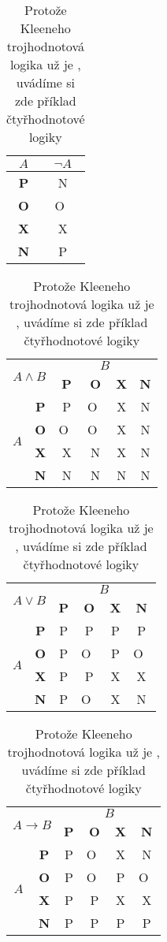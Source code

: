 \documentclass[hidelinks, 11pt, a4paper]{article}
\begin{document}
\begin{table}[h]
    \centering
    \begin{tabular}{|c|c|} \hline
        $A$ & $\neg A$ \\ \hline
        \textbf{P} & N \\ \hline
        \textbf{O} & O~\\ \hline
        \textbf{X} & X \\ \hline
        \textbf{N} & P \\ \hline
    \end{tabular}
    \begin{tabular}{|c|c|c|c|c|c|}\hline
        \multicolumn{2}{|c|}{\multirow{2}{*}{$A \land B$}}&\multicolumn{4}{c|}{$B$} \\ \cline{3-6}
        \multicolumn{2}{|c|}{}&\textbf{P} & \textbf{O} & \textbf{X} & \textbf{N} \\ \hline
        \multirow{4}{*}{$A$} & \textbf{P} & P & O~& X & N \\ \cline{2-6}
        &\textbf{O} & O~& O~& X & N \\ \cline{2-6}
        &\textbf{X} & X & N & X & N \\ \cline{2-6}
        &\textbf{N} & N & N & N & N \\ \hline
    \end{tabular}
    \begin{tabular}{|c|c|c|c|c|c|}\hline
        \multicolumn{2}{|c|}{\multirow{2}{*}{$A \lor B$}}&\multicolumn{4}{c|}{$B$} \\ \cline{3-6}
        \multicolumn{2}{|c|}{}&\textbf{P} & \textbf{O} & \textbf{X} & \textbf{N} \\ \hline
        \multirow{4}{*}{$A$} & \textbf{P} & P & P & P & P \\ \cline{2-6}
        &\textbf{O} & P & O~& P & O~\\ \cline{2-6}
        &\textbf{X} & P & P & X & X \\ \cline{2-6}
        &\textbf{N} & P & O~& X & N \\ \hline
    \end{tabular}
    \begin{tabular}{|c|c|c|c|c|c|}\hline
        \multicolumn{2}{|c|}{\multirow{2}{*}{$A \to B$}}&\multicolumn{4}{c|}{$B$} \\ \cline{3-6}
        \multicolumn{2}{|c|}{}&\textbf{P} & \textbf{O} & \textbf{X} & \textbf{N} \\ \hline
        \multirow{4}{*}{$A$} & \textbf{P} & P & O~& X & N \\ \cline{2-6}
        &\textbf{O} & P & O~& P & O~\\ \cline{2-6}
        &\textbf{X} & P & P & X & X \\ \cline{2-6}
        &\textbf{N} & P & P & P & P \\ \hline
    \end{tabular}
    \caption{Protože Kleeneho trojhodnotová logika už je , uvádíme si zde příklad čtyřhodnotové logiky} 
    \label{tab:tabulka2}
\end{table}
\bigskip
\pagebreak
\end{document}
